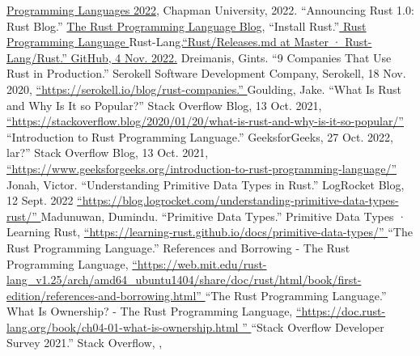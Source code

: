 \documentclass{article}
\theoremstyle{theorem}
\theoremstyle{definition}
\theoremstyle{remark}
\begin{document}
\begin{thebibliography}{99}
 \href{https://github.com/alexhkurz/programming-languages-2022/blob/main/README.md}{Programming Languages 2022}, Chapman University, 2022.
“Announcing Rust 1.0: Rust Blog.” \href{https://blog.rust-lang.org/2015/05/15/Rust-1.0.html}{The Rust Programming Language Blog},
 “Install Rust.”\href{https://github.com/alexhkurz/programming-languages-2022/blob/main/README.md}{ Rust Programming Language }
Rust-Lang.\href{https://github.com/rust-lang/rust/blob/master/RELEASES.md}  {“Rust/Releases.md at Master · Rust-Lang/Rust.” GitHub, 4 Nov. 2022.} 
Dreimanis, Gints. “9 Companies That Use Rust in Production.” Serokell Software Development Company, Serokell, 18 Nov. 2020,
\href{https://serokell.io/blog/rust-companies}  {“https://serokell.io/blog/rust-companies.” } 
Goulding, Jake. “What Is Rust and Why Is It so Popular?” Stack Overflow Blog, 13 Oct. 2021,
\href{https://stackoverflow.blog/2020/01/20/what-is-rust-and-why-is-it-so-popular/}  {“https://stackoverflow.blog/2020/01/20/what-is-rust-and-why-is-it-so-popular/” } 
“Introduction to Rust Programming Language.” GeeksforGeeks, 27 Oct. 2022, 
lar?” Stack Overflow Blog, 13 Oct. 2021,
\href{https://www.geeksforgeeks.org/introduction-to-rust-programming-language/}  {“https://www.geeksforgeeks.org/introduction-to-rust-programming-language/” } 
Jonah, Victor. “Understanding Primitive Data Types in Rust.” LogRocket Blog, 12 Sept. 2022
\href{https://blog.logrocket.com/understanding-primitive-data-types-rust/}  {“https://blog.logrocket.com/understanding-primitive-data-types-rust/” }
Madunuwan, Dumindu. “Primitive Data Types.” Primitive Data Types · Learning Rust, 
\href{https://learning-rust.github.io/docs/primitive-data-types/}  {“https://learning-rust.github.io/docs/primitive-data-types/” }
“The Rust Programming Language.” References and Borrowing - The Rust Programming Language, 
\href{https://web.mit.edu/rust-lang_v1.25/arch/amd64_ubuntu1404/share/doc/rust/html/book/first-edition/references-and-borrowing.html}  {“https://web.mit.edu/rust-lang_v1.25/arch/amd64_ubuntu1404/share/doc/rust/html/book/first-edition/references-and-borrowing.html” }
“The Rust Programming Language.” What Is Ownership? - The Rust Programming Language,
\href{https://doc.rust-lang.org/book/ch04-01-what-is-ownership.html
}  {“https://doc.rust-lang.org/book/ch04-01-what-is-ownership.html
” }
“Stack Overflow Developer Survey 2021.” Stack Overflow, ,

\end{thebibliography}
\end{document}

